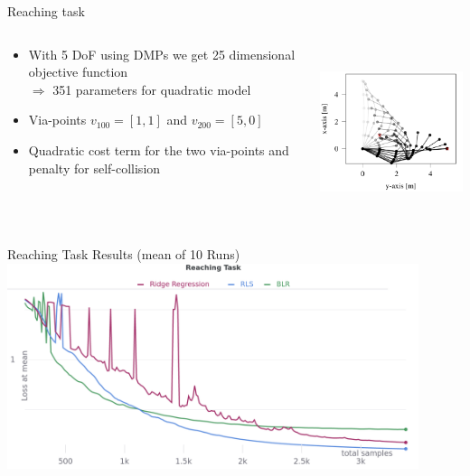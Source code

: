 \documentclass[navbarinfooter, 12pt]{sdqbeamer}
\begin{document}
\begin{frame}{Reaching task}
  \begin{columns}[c]
    \begin{column}{8cm}
      \begin{itemize}
      \item With 5 DoF using DMPs we get 25
        dimensional objective function \\
      $\Rightarrow$ 351 parameters for quadratic model
      \item Via-points $v_{100} = [1, 1]$  and
        $v_{200} = [5, 0]$
      \item Quadratic cost term for the two via-points and penalty
        for self-collision
      \end{itemize}
    \end{column}

    \begin{column}{5cm}
      \includegraphics[height=5cm]{figures/via_movement.png}
    \end{column}
  \end{columns}
\end{frame}


\begin{frame}{Reaching Task Results (mean of 10 Runs)}
  \centering
  \includegraphics[height=6cm]{figures/reaching_results.png}
\end{frame}
\end{document}
